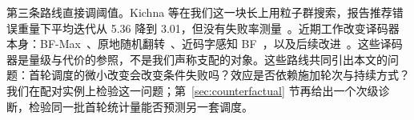 第三条路线直接调阈值。Kichna 等在我们这一块长上用粒子群搜索，报告推荐错误重量下平均迭代从 5.36 降到 3.01，但没有失败率测量~\cite{kichna2025pso}。近期工作改变译码器本身：BF-Max~\cite{baldelli2025bfmax}、原地随机翻转~\cite{baldi2021inplace}、近码字感知 BF~\cite{baldelli2026ncw}，以及后续改进~\cite{santini2026flip}。这些译码器是量级与代价的参照，不是我们声称支配的对象。这些路线共同引出本文的问题：首轮调度的微小改变会改变条件失败吗？效应是否依赖施加轮次与持续方式？我们在配对实例上检验这一问题；第~\ref{sec:counterfactual} 节再给出一个次级诊断，检验同一批首轮统计量能否预测另一套调度。
